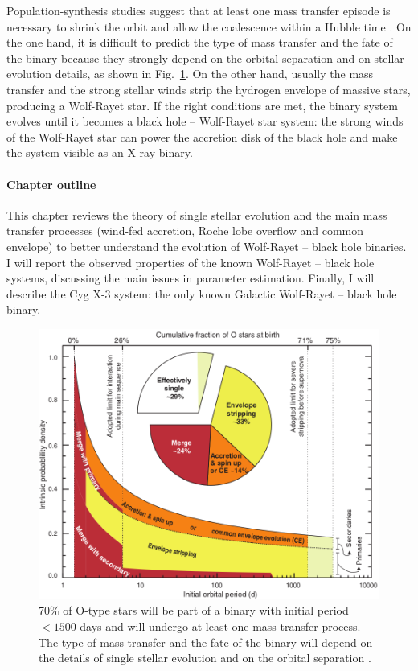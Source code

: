 \documentclass[a4paper,titlepage]{book}     	%
\begin{document}
Population-synthesis studies suggest that at least one mass transfer episode is necessary to shrink the orbit and allow the coalescence within a Hubble time \cite{spera2019_mergingBBH}. On the one hand, it is difficult to predict the type of mass transfer and the fate of the binary because they strongly depend on the orbital separation and on stellar evolution details, as shown in Fig.\ \ref{fig:Sana2012MTfate}. On the other hand, usually the mass transfer and the strong stellar winds strip the hydrogen envelope of massive stars, producing a Wolf-Rayet star. If the right conditions are met, the binary system evolves until it becomes a black hole -- Wolf-Rayet star system: the strong winds of the Wolf-Rayet star can power the accretion disk of the black hole and make the system visible as an X-ray binary.

\paragraph{Chapter outline}
This chapter reviews the theory of single stellar evolution and the main mass transfer processes (wind-fed accretion, Roche lobe overflow and common envelope) to better understand the evolution of Wolf-Rayet -- black hole binaries. I will report the observed properties of the known Wolf-Rayet -- black hole systems, discussing the main issues in parameter estimation. Finally, I will describe the Cyg X-3 system: the only known Galactic Wolf-Rayet -- black hole binary.


\begin{figure}[h!]
	\centering
	\includegraphics[width=.65\textwidth]{./images/Sana2012MTfate.png}
	\caption{70\% of O-type stars will be part of a binary with initial period $< 1500$ days and will undergo at least one mass transfer process. The type of mass transfer and the fate of the binary will depend on the details of single stellar evolution and on the orbital separation \cite{Sana2012}.}\label{fig:Sana2012MTfate}
\end{figure}
\end{document}
